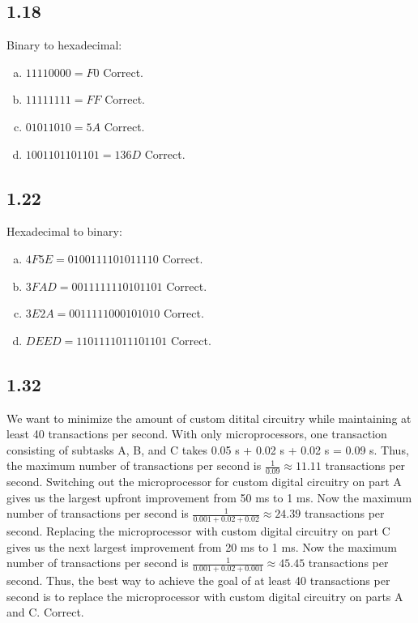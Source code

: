 \documentclass{article}
\begin{document}
\subsection*{1.18}
Binary to hexadecimal:
\begin{enumerate}[(a)]
    \item $11110000 = F0$ \textcolor{mygreen}{Correct.}
    \item $11111111 = FF$ \textcolor{mygreen}{Correct.}
    \item $01011010 = 5A$ \textcolor{mygreen}{Correct.}
    \item $1001101101101 = 136D$ \textcolor{mygreen}{Correct.}
\end{enumerate}

\subsection*{1.22}
Hexadecimal to binary:
\begin{enumerate}[(a)]
    \item $4F5E = 0100111101011110$ \textcolor{mygreen}{Correct.}
    \item $3FAD = 0011111110101101$ \textcolor{mygreen}{Correct.}
    \item $3E2A = 0011111000101010$ \textcolor{mygreen}{Correct.}
    \item $DEED = 1101111011101101$ \textcolor{mygreen}{Correct.}
\end{enumerate}

\subsection*{1.32}
We want to minimize the amount of custom ditital circuitry while maintaining at least 40 transactions per second.
With only microprocessors, one transaction consisting of subtasks A, B, and C takes 0.05 s + 0.02 s + 0.02 s = 0.09 s.
Thus, the maximum number of transactions per second is $\frac{1}{0.09} \approx 11.11$ transactions per second.
Switching out the microprocessor for custom digital circuitry on part A gives us the largest upfront improvement from 50 ms to 1 ms.
Now the maximum number of transactions per second is $\frac{1}{0.001 + 0.02 + 0.02} \approx 24.39$ transactions per second.
Replacing the microprocessor with custom digital circuitry on part C gives us the next largest improvement from 20 ms to 1 ms.
Now the maximum number of transactions per second is $\frac{1}{0.001 + 0.02 + 0.001} \approx 45.45$ transactions per second.
Thus, the best way to achieve the goal of at least 40 transactions per second is to replace the microprocessor with custom digital circuitry on parts A and C.
\textcolor{mygreen}{Correct.}
\end{document}
